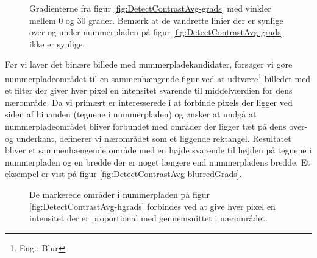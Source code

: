 \begin{figure}[htp]
  \centering
  \caption{Gradienterne fra figur \vref{fig:DetectContrastAvg-grads} med vinkler mellem 0 og 30 grader. Bemærk at de vandrette linier der er synlige over og under nummerpladen på figur \ref{fig:DetectContrastAvg-grads} ikke er synlige.}
  \label{fig:DetectContrastAvg-hgrads}  
\end{figure}


Før vi laver det binære billede med nummerpladekandidater, forsøger vi gøre nummerpladeområdet til en sammenhængende figur ved at udtvære\footnote{Eng.: Blur} billedet med et filter der giver hver pixel en intensitet svarende til middelværdien for dens nærområde. Da vi primært er interesserede i at forbinde pixels der ligger ved siden af hinanden (tegnene i nummerpladen) og ønsker at undgå at nummerpladeområdet bliver forbundet med områder der ligger tæt på dens over- og underkant, definerer vi nærområdet som et liggende rektangel. Resultatet bliver et sammenhængende område med en højde svarende til højden på tegnene i nummerpladen og en bredde der er noget længere end nummerpladens bredde. Et eksempel er vist på figur \vref{fig:DetectContrastAvg-blurredGrads}. 

\begin{figure}[htp]
  \centering
  \caption{De markerede områder i nummerpladen på figur \vref{fig:DetectContrastAvg-hgrads} forbindes ved at give hver pixel en intensitet der er proportional med gennemsnittet i nærområdet.}
  \label{fig:DetectContrastAvg-blurredGrads}  
\end{figure}


